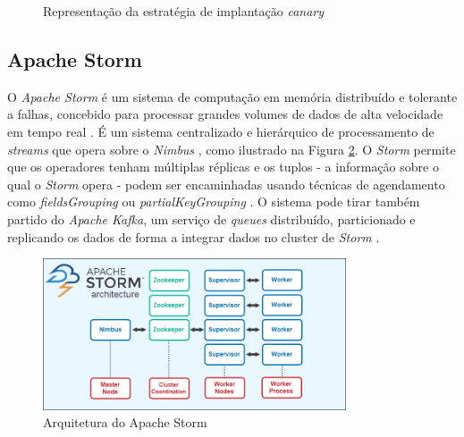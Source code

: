 \begin{figure}[H]
    \centering
    \qquad
    \caption{Representação da estratégia de implantação \textit{canary}}%
    \label{fig:blue-green}%
\end{figure}

\subsection{Apache Storm}

O \textit{Apache Storm} é um sistema de computação em memória distribuído e tolerante a falhas, 
concebido para processar grandes volumes de dados de alta velocidade em tempo real \cite{storm2017}. 
É um sistema centralizado e hierárquico de processamento de \textit{streams} que opera sobre o 
\textit{Nimbus} \cite{storm2015}, como ilustrado na Figura \ref{fig:storm-architecture}. O 
\textit{Storm} permite que os operadores tenham múltiplas réplicas e os tuplos - a informação 
sobre o qual o \textit{Storm} opera - podem ser encaminhadas usando técnicas de agendamento como 
\textit{fieldsGrouping} ou \textit{partialKeyGrouping} \cite{storm2018}. O sistema pode tirar 
também partido do \textit{Apache Kafka}, um serviço de \textit{queues} distribuído, particionado e 
replicando os dados de forma a integrar dados no \gls{cluster} de \textit{Storm} \cite{storm2018b}.

\begin{figure}[H]
    \centering
    \includegraphics[width=0.8\textwidth]{media/content/estado-arte/apache-storm-architecture.png}
    \caption{Arquitetura do Apache Storm}
    \label{fig:storm-architecture}
\end{figure}

